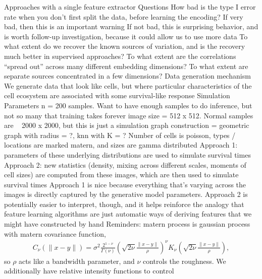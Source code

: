 \documentclass[11pt]{article}
\begin{document}
\begin{outline}
  \1 Approaches with a single feature extractor
    \2 Questions
      \3 How bad is the type I error rate when you don't first split the data,
      before learning the encoding?
        \4 If very bad, then this is an important warning
        \4 If not bad, this is surprising behavior, and is worth follow-up
        investigation, because it could allow us to use more data
      \3 To what extent do we recover the known sources of variation, and is the
      recovery much better in supervised approaches?
        \4 To what extent are the correlations ``spread out'' across many
        different embedding dimensions? To what extent are separate sources
        concentrated in a few dimensions?
    \2 Data generation mechanism
      \3 We generate data that look like cells, but where particular
      characteristics of the cell ecosystem are associated with some
      survival-like response
      \3 Simulation Parameters
        \4 n = 200 samples. Want to have enough samples to do inference, but not
        so many that training takes forever
        \4 image size = 512 x 512. Normal samples are ~ 2000 x 2000, but this is
        just a simulation
        \4 graph construction = geometric graph with radius = ?, knn with K = ?
      \3 Number of cells is poisson, types / locations are marked matern, and
      sizes are gamma distributed
        \4 Approach 1: parameters of these underlying distributions are used to
        simulate survival times
        \4 Approach 2: new statistics (density, mixing across different scales,
        moments of cell sizes) are computed from these images, which are then
        used to simulate survival times
        \4 Approach 1 is nice because everything that's varying across the
        images is directly captured by the generative model parameters. Approach
        2 is potentially easier to interpret, though, and it helps reinforce the
        analogy that feature learning algorithms are just automatic ways of
        deriving features that we might have constructed by hand
        \4 Reminders: matern process is gaussian process with matern covariance
        function,
        \begin{align}
          C_{\nu}(\|x - y\|)=\sigma^{2} \frac{2^{1-\nu}}{\Gamma(\nu)}\left(\sqrt{2 \nu} \frac{\|x - y\|}{\rho}\right)^{\nu} K_{\nu}\left(\sqrt{2 \nu} \frac{\|x - y\|}{\rho}\right),
        \end{align}
        so $\rho$ acts like a bandwidth parameter, and $\nu$ controls the
        roughness. We additionally have relative intensity functions to control

\end{outline}
\end{document}
